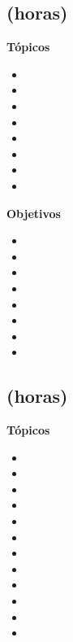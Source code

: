 \subsection{\ALDOSDef  (\ALDOSHours horas)}\label{sec:BOK-AL2}

\textbf{Tópicos}
\begin{itemize}
	\item \ALDOSTopicAlgoritmos
	\item \ALDOSTopicAlgoritmosgolosos
	\item \ALDOSTopicDividir
	\item \ALDOSTopicRegresion
	\item \ALDOSTopicBifurcacion
	\item \ALDOSTopicHeuristicas
	\item \ALDOSTopicCasamiento
	\item \ALDOSTopicAlgoritmosde
\end{itemize}

\textbf{Objetivos}
\begin{itemize}
	\item \ALDOSObjUNO
	\item \ALDOSObjDOS
	\item \ALDOSObjTRES
	\item \ALDOSObjCUATRO
	\item \ALDOSObjCINCO
	\item \ALDOSObjSEIS
	\item \ALDOSObjSIETE
	\item \ALDOSObjOCHO
\end{itemize}

\subsection{\ALTRESDef  (\ALTRESHours horas)}\label{sec:BOK-AL3}

\textbf{Tópicos}
\begin{itemize}
	\item \ALTRESTopicAlgoritmos
	\item \ALTRESTopicBusqueda
	\item \ALTRESTopicAlgoritmoscuadraticos
	\item \ALTRESTopicAlgoritmosde
	\item \ALTRESTopicTablas
	\item \ALTRESTopicArboles
	\item \ALTRESTopicRepresentacion
	\item \ALTRESTopicRecorridos
	\item \ALTRESTopicEl
	\item \ALTRESTopicCerradura
	\item \ALTRESTopicArbol
	\item \ALTRESTopicOrdenamiento
\end{itemize}

